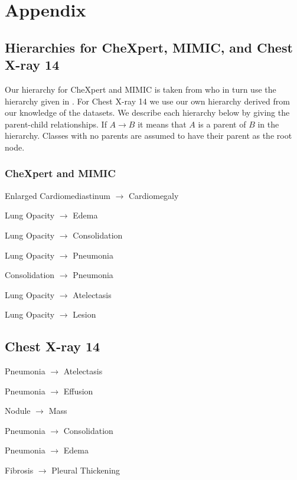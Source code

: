 \section*{Appendix}

\subsection*{Hierarchies for CheXpert, MIMIC, and Chest X-ray 14}
Our hierarchy for CheXpert and MIMIC is taken from \citet{pham2021interpreting} who in turn use the hierarchy given in \citet{irvin2019chexpert}. For Chest X-ray 14 we use our own hierarchy derived from our knowledge of the datasets. We describe each hierarchy below by giving the parent-child relationships. If $A\rightarrow B$ it means that $A$ is a parent of $B$ in the hierarchy. Classes with no parents are assumed to have their parent as the root node.
\subsubsection*{CheXpert and MIMIC}
Enlarged Cardiomediastinum $\rightarrow$ Cardiomegaly

Lung Opacity $\rightarrow$ Edema

Lung Opacity $\rightarrow$ Consolidation

Lung Opacity $\rightarrow$ Pneumonia

Consolidation $\rightarrow$ Pneumonia

Lung Opacity $\rightarrow$ Atelectasis

Lung Opacity $\rightarrow$ Lesion

\subsection*{Chest X-ray 14}
Pneumonia $\rightarrow$ Atelectasis

Pneumonia $\rightarrow$ Effusion

Nodule $\rightarrow$ Mass

Pneumonia $\rightarrow$ Consolidation

Pneumonia $\rightarrow$ Edema

Fibrosis $\rightarrow$ Pleural Thickening